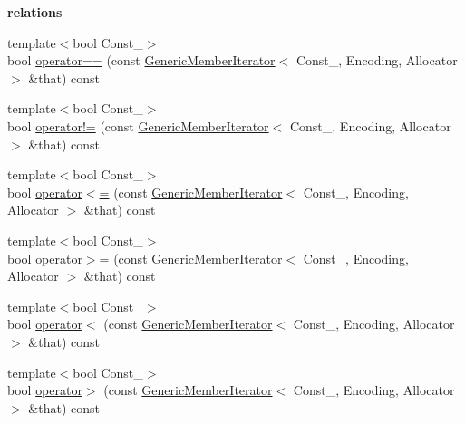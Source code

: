 \begin{Indent}\textbf{ relations}\par
\begin{DoxyCompactItemize}
\item 
{\footnotesize template$<$bool Const\+\_\+$>$ }\\bool \hyperlink{classGenericMemberIterator_a79ec0aac9cd098fddd656b3ce55d0c0a}{operator==} (const \hyperlink{classGenericMemberIterator}{Generic\+Member\+Iterator}$<$ Const\+\_\+, Encoding, Allocator $>$ \&that) const
\item 
{\footnotesize template$<$bool Const\+\_\+$>$ }\\bool \hyperlink{classGenericMemberIterator_ad1d518be7ace72462fc77cd4c6f250e2}{operator!=} (const \hyperlink{classGenericMemberIterator}{Generic\+Member\+Iterator}$<$ Const\+\_\+, Encoding, Allocator $>$ \&that) const
\item 
{\footnotesize template$<$bool Const\+\_\+$>$ }\\bool \hyperlink{classGenericMemberIterator_a1d6b406f68ff02515fdc3e0385057a12}{operator$<$=} (const \hyperlink{classGenericMemberIterator}{Generic\+Member\+Iterator}$<$ Const\+\_\+, Encoding, Allocator $>$ \&that) const
\item 
{\footnotesize template$<$bool Const\+\_\+$>$ }\\bool \hyperlink{classGenericMemberIterator_ab6d9e8fce04a598f10453b3f722c78ac}{operator$>$=} (const \hyperlink{classGenericMemberIterator}{Generic\+Member\+Iterator}$<$ Const\+\_\+, Encoding, Allocator $>$ \&that) const
\item 
{\footnotesize template$<$bool Const\+\_\+$>$ }\\bool \hyperlink{classGenericMemberIterator_aaadf9036c5d4563cf00019ba840dd09a}{operator$<$} (const \hyperlink{classGenericMemberIterator}{Generic\+Member\+Iterator}$<$ Const\+\_\+, Encoding, Allocator $>$ \&that) const
\item 
{\footnotesize template$<$bool Const\+\_\+$>$ }\\bool \hyperlink{classGenericMemberIterator_a1b2faefeb0d9bbc04bd02d69d25828f5}{operator$>$} (const \hyperlink{classGenericMemberIterator}{Generic\+Member\+Iterator}$<$ Const\+\_\+, Encoding, Allocator $>$ \&that) const
\end{DoxyCompactItemize}
\end{Indent}
